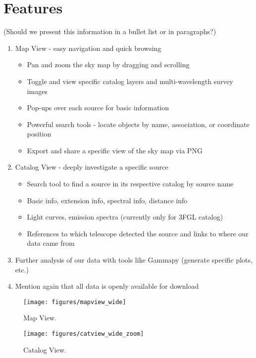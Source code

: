 \section{Features}

(Should we present this information in a bullet list or in paragraphs?)

\begin{enumerate}

\item Map View - easy navigation and quick browsing

  \begin{itemize}

  \item Pan and zoom the sky map by dragging and scrolling

  \item Toggle and view specific catalog layers and multi-wavelength survey images

  \item Pop-ups over each source for basic information

  \item Powerful search tools - locate objects by name, association, or coordinate position

  \item Export and share a specific view of the sky map via PNG

  \end{itemize}


\item Catalog View - deeply investigate a specific source

  \begin{itemize}

  \item Search tool to find a source in its respective catalog by source name

  \item Basic info, extension info, spectral info, distance info

  \item Light curves, emission spectra (currently only for 3FGL catalog)

  \item References to which telescope detected the source and links to where our data came from

  \end{itemize}


\item Further analysis of our data with tools like Gammapy (generate specific plots, etc.)

\item Mention again that all data is openly available for download

\end{enumerate}

\begin{figure}[h]
  \centerline{\texttt{[image: figures/mapview\_wide]}}
  \caption{Map View.}
\end{figure}

\begin{figure}[h]
  \centerline{\texttt{[image: figures/catview\_wide\_zoom]}}
  \caption{Catalog View.}
\end{figure}
